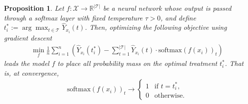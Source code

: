 \documentclass[10pt,a4paper]{amsart}
\newtheorem{proposition}{Proposition}
\begin{document}
\begin{proposition}
Let $f: \mathcal{X} \to \mathbb{R}^{|\mathcal{T}|}$ be a neural network whose output is passed through a softmax layer with fixed temperature $\tau > 0$, and define $t^*_i := \arg\max_{t \in \mathcal{T}} \hat{Y}_{x_i}(t)$. Then, optimizing  the following objective using gradient descent 
\begin{align}
    \min_f \frac{1}{n} \sum_{i=1}^n \left( \hat{Y}_{x_i}(t^*_i) - \sum_{t=1}^{|\mathcal{T}|} \hat{Y}_{x_i}(t) \cdot \mathrm{softmax}(f(x_i))_t \right)
\end{align}
leads the model $f$ to place all probability mass on the optimal treatment $t^*_i$. That is, at convergence,
\begin{align}
    \mathrm{softmax}(f(x_i))_t \to 
    \begin{cases}
        1 & \text{if } t = t^*_i, \\
        0 & \text{otherwise}.
    \end{cases}
\end{align}
\end{proposition}
\end{document}
